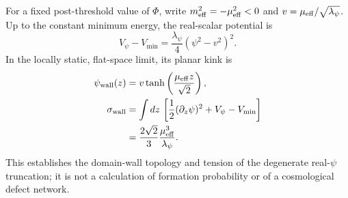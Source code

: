 \documentclass[epj]{svjour}
\begin{document}
For a fixed post-threshold value of $\Phi$, write
$m_{\rm eff}^2=-\mu_{\rm eff}^2<0$ and
$v=\mu_{\rm eff}/\sqrt{\lambda_\psi}$. Up to the constant
minimum energy, the real-scalar potential is
\begin{equation}
V_\psi-V_{\min}
=\frac{\lambda_\psi}{4}(\psi^2-v^2)^2.
\end{equation}
In the locally static, flat-space limit, its planar kink is
\begin{equation}
\begin{aligned}
\psi_{\rm wall}(z)
&=v\tanh\left(\frac{\mu_{\rm eff}z}{\sqrt2}\right),\\
\sigma_{\rm wall}
&=\int dz\,\left[
\frac12(\partial_z\psi)^2+V_\psi-V_{\min}
\right]\\
&=\frac{2\sqrt2}{3}
\frac{\mu_{\rm eff}^3}{\lambda_\psi}.
\end{aligned}
\label{eq:ptum_domain_wall_tension}
\end{equation}
This establishes the domain-wall topology and tension of the
degenerate real-$\psi$ truncation; it is not a calculation of
formation probability or of a cosmological defect network.
\end{document}
